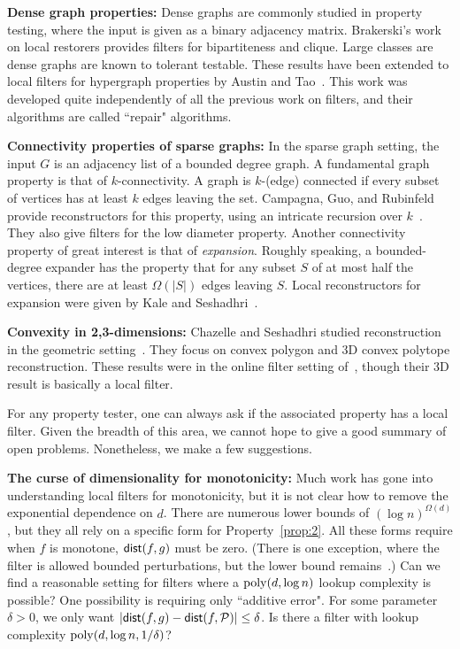 \documentclass[natbib]{svcyclop}
\def\dist{{\sf dist}}
\begin{document}
{\bf Dense graph properties:} Dense graphs are commonly studied in property testing, where
the input is given as a binary adjacency matrix. Brakerski's work on local restorers provides
filters for bipartiteness and clique. Large classes are dense graphs are known
to tolerant testable. These results have been extended to local filters
for hypergraph properties by Austin and Tao~\cite{AT09}. This work was developed quite independently
of all the previous work on filters, and their algorithms are called ``repair"
algorithms.

{\bf Connectivity properties of sparse graphs:} In the sparse graph setting, the input $G$
is an adjacency list of a bounded degree graph. A fundamental graph property is that of $k$-connectivity.
A graph is $k$-(edge) connected if every subset of vertices has at least $k$ edges leaving the set.
Campagna, Guo, and Rubinfeld provide reconstructors for this property, using an intricate
recursion over $k$~\cite{CaGuRu13}. They also give filters for the low diameter property.
Another connectivity property of great interest is that of \emph{expansion}.
Roughly speaking, a bounded-degree expander has the property that for any subset $S$ of at most half the vertices, there
are at least $\Omega(|S|)$ edges leaving $S$.
Local reconstructors for expansion were given by Kale and Seshadhri~\cite{KalS11-j}.

{\bf Convexity in 2,3-dimensions:} 
Chazelle and Seshadhri studied reconstruction in the geometric setting~\cite{ChSe11-j}. They focus
on convex polygon and 3D convex polytope reconstruction. These results were in the online filter
setting of~\cite{ACCL2}, though their 3D result is basically a local filter. 

\OpenProb

For any property tester, one can always ask if the associated property has a local filter.
Given the breadth of this area, we cannot hope to give a good summary of open problems. Nonetheless,
we make a few suggestions.

{\bf The curse of dimensionality for monotonicity:} Much work has gone into understanding local filters
for monotonicity, but it is not clear how to remove the exponential dependence on $d$.
There are numerous lower bounds of $(\log n)^{\Omega(d)}$, but they all rely on a specific form for Property~\ref{prop:2}.
All these forms require when $f$ is monotone, $\dist(f,g)$ must be zero. (There is one exception, where the filter is allowed
bounded perturbations, but the lower bound remains~\cite{AwJh+12}.) Can we find a reasonable setting for filters where
a $\mathrm{poly}(d,\log n)$ lookup complexity is possible? One possibility is requiring only ``additive error".
For some parameter $\delta > 0$, we only want $|\dist(f,g) - \dist(f,\cP)| \leq \delta$. Is there a filter
with lookup complexity $\mathrm{poly}(d,\log n,1/\delta)$?
\end{document}

